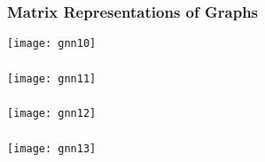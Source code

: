 \begin{frame}[fragile]\frametitle{Matrix Representations of Graphs}

\begin{center}
\texttt{[image: gnn10]}
\end{center}	  

\end{frame}

\begin{frame}[fragile]\frametitle{}

\begin{center}
\texttt{[image: gnn11]}
\end{center}	  

\end{frame}

\begin{frame}[fragile]\frametitle{}

\begin{center}
\texttt{[image: gnn12]}
\end{center}	  

\end{frame}


\begin{frame}[fragile]\frametitle{}

\begin{center}
\texttt{[image: gnn13]}
\end{center}	  

\end{frame}


